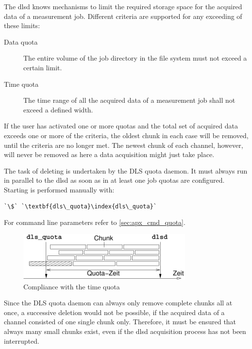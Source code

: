 \documentclass[a4paper,12pt,BCOR6mm,bibtotoc,idxtotoc]{scrbook}
\begin{document}
The dlsd knows mechanisms to limit the required storage space for the acquired
data of a measurement job. Different criteria are supported for any exceeding
of these limits:

\begin{description}

\item[Data quota] The entire volume of the job directory in the file system
must not exceed a certain limit.

\item[Time quota] The time range of all the acquired data of a measurement job
shall not exceed a defined width.

\end{description}

If the user has activated one or more quotas and the total set of acquired
data exceeds one or more of the criteria, the oldest chunk in
each case will be removed, until the criteria are no longer met. The newest
chunk of each channel, however, will never be removed as here a data
acquisition might just take place.

The task of deleting is undertaken by the DLS quota daemon. It must always run
in parallel to the dlsd as soon as in at least one job quotas are configured.
Starting is performed manually with:

\begin{lstlisting}
`\$` `\textbf{dls\_quota}\index{dls\_quota}`
\end{lstlisting}

For command line parameters refer to \autoref{sec:apx_cmd_quota}.

\begin{figure}[htb]
 \begin{center}
  \includegraphics[width=250pt]{bilder/quota}
 \end{center}
 \caption{Compliance with the time quota}
 \label{fig:quota}
\end{figure}

Since the DLS quota daemon can always only remove complete chunks
all at once, a successive deletion would not be possible, if the acquired data
of a channel consisted of one single chunk only. Therefore, it must be ensured
that always many small chunks exist, even if the dlsd acquisition process has
not been interrupted.
\end{document}
